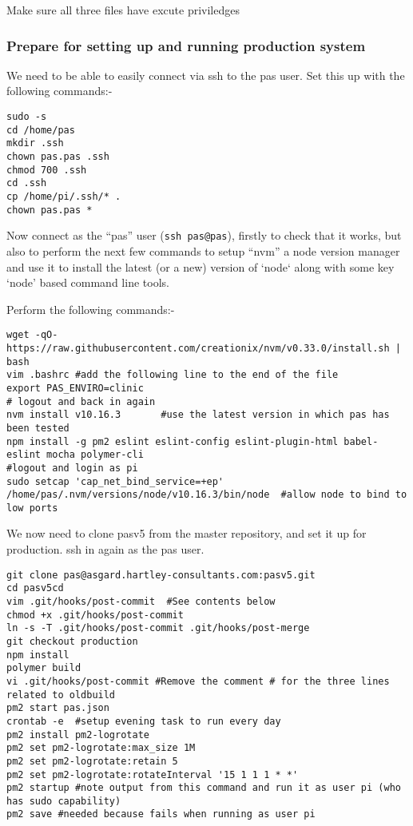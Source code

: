 \documentclass[Draft]{akc}
\begin{document}
Make sure all three files have excute priviledges


\subsubsection{Prepare for setting up and running production system}

We need to be able to easily connect via ssh to the pas user.  Set this up with
the following commands:-

\begin{lstlisting}
sudo -s
cd /home/pas
mkdir .ssh
chown pas.pas .ssh
chmod 700 .ssh
cd .ssh
cp /home/pi/.ssh/* .
chown pas.pas *
\end{lstlisting}

Now connect as the ``pas'' user (\texttt{ssh pas@pas}), firstly to check that it works, but also
to perform the next few commands to setup ``nvm'' a node version manager and use it to install the latest
(or a new) version of `node` along with some key `node' based command line tools.

Perform the following commands:-

\begin{lstlisting}
wget -qO- https://raw.githubusercontent.com/creationix/nvm/v0.33.0/install.sh | bash
vim .bashrc #add the following line to the end of the file
export PAS_ENVIRO=clinic
# logout and back in again
nvm install v10.16.3       #use the latest version in which pas has been tested
npm install -g pm2 eslint eslint-config eslint-plugin-html babel-eslint mocha polymer-cli
#logout and login as pi
sudo setcap 'cap_net_bind_service=+ep' /home/pas/.nvm/versions/node/v10.16.3/bin/node  #allow node to bind to low ports
\end{lstlisting}

We now need to clone pasv5 from the master repository, and set it up for production.  ssh in again as the pas user.

\begin{lstlisting}
git clone pas@asgard.hartley-consultants.com:pasv5.git
cd pasv5cd
vim .git/hooks/post-commit  #See contents below
chmod +x .git/hooks/post-commit
ln -s -T .git/hooks/post-commit .git/hooks/post-merge
git checkout production
npm install
polymer build
vi .git/hooks/post-commit #Remove the comment # for the three lines related to oldbuild
pm2 start pas.json
crontab -e  #setup evening task to run every day
pm2 install pm2-logrotate
pm2 set pm2-logrotate:max_size 1M
pm2 set pm2-logrotate:retain 5
pm2 set pm2-logrotate:rotateInterval '15 1 1 1 * *'
pm2 startup #note output from this command and run it as user pi (who has sudo capability)
pm2 save #needed because fails when running as user pi
\end{lstlisting}
\end{document}
